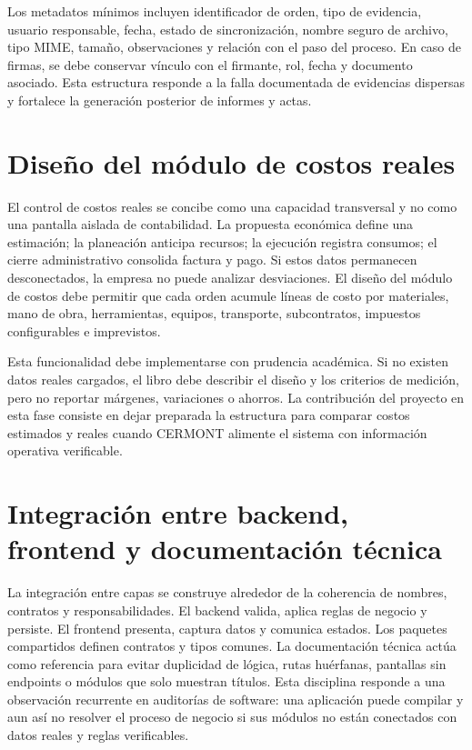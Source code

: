 Los metadatos mínimos incluyen identificador de orden, tipo de evidencia, usuario responsable, fecha, estado de sincronización, nombre seguro de archivo, tipo MIME, tamaño, observaciones y relación con el paso del proceso. En caso de firmas, se debe conservar vínculo con el firmante, rol, fecha y documento asociado. Esta estructura responde a la falla documentada de evidencias dispersas y fortalece la generación posterior de informes y actas.

\section{Diseño del módulo de costos reales}
\label{sec:diseno-modulo-costos-reales}

El control de costos reales se concibe como una capacidad transversal y no como una pantalla aislada de contabilidad. La propuesta económica define una estimación; la planeación anticipa recursos; la ejecución registra consumos; el cierre administrativo consolida factura y pago. Si estos datos permanecen desconectados, la empresa no puede analizar desviaciones. El diseño del módulo de costos debe permitir que cada orden acumule líneas de costo por materiales, mano de obra, herramientas, equipos, transporte, subcontratos, impuestos configurables e imprevistos.

Esta funcionalidad debe implementarse con prudencia académica. Si no existen datos reales cargados, el libro debe describir el diseño y los criterios de medición, pero no reportar márgenes, variaciones o ahorros. La contribución del proyecto en esta fase consiste en dejar preparada la estructura para comparar costos estimados y reales cuando CERMONT alimente el sistema con información operativa verificable.

\section{Integración entre backend, frontend y documentación técnica}
\label{sec:integracion-backend-frontend-docs}

La integración entre capas se construye alrededor de la coherencia de nombres, contratos y responsabilidades. El backend valida, aplica reglas de negocio y persiste. El frontend presenta, captura datos y comunica estados. Los paquetes compartidos definen contratos y tipos comunes. La documentación técnica actúa como referencia para evitar duplicidad de lógica, rutas huérfanas, pantallas sin endpoints o módulos que solo muestran títulos. Esta disciplina responde a una observación recurrente en auditorías de software: una aplicación puede compilar y aun así no resolver el proceso de negocio si sus módulos no están conectados con datos reales y reglas verificables.

